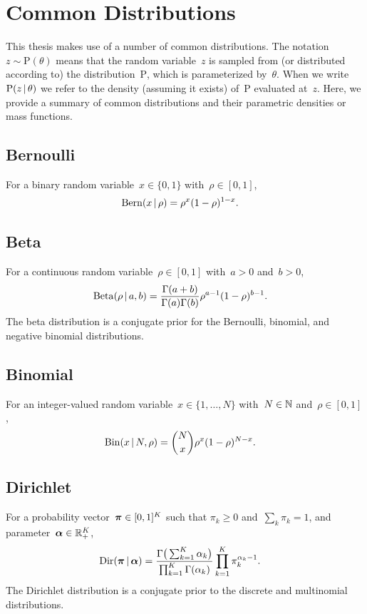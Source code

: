 \chapter{Common Distributions}
\label{app:A}

This thesis makes use of a number of common distributions.  The
notation~${z \sim \mathrm{P}(\theta)}$ means that the random
variable~$z$ is sampled from (or distributed according to) the
distribution~$\mathrm{P}$, which is parameterized by~$\theta$. When we
write~${\mathrm{P}(z \,|\, \theta)}$ we refer to the density
(assuming it exists) of~$\mathrm{P}$ evaluated at~$z$.  Here, we
provide a summary of common distributions and their parametric
densities or mass functions.

\section*{Bernoulli}
For a binary random variable~$x \in \{0,1\}$ with~$\rho \in [0,1]$,
\begin{align*}
  \mathrm{Bern}(x \,|\, \rho) &= \rho^x (1-\rho)^{1-x}.
\end{align*}

\section*{Beta}
For a continuous random variable~$\rho \in [0,1]$ with~$a>0$ and~$b>0$,
\begin{align*}
  \mathrm{Beta}(\rho \,|\, a, b)
  &= \frac{ \Gamma(a+b)}{\Gamma(a) \Gamma(b)} \rho^{a-1} (1-\rho)^{b-1}.
\end{align*}
The beta distribution is a conjugate prior for the Bernoulli,
binomial, and negative binomial distributions.

\section*{Binomial}
For an integer-valued random variable~$x \in \{1, \ldots, N \}$
with~$N \in \mathbb{N}$ and~$\rho \in [0,1]$,
\begin{align*}
  \mathrm{Bin}(x \,|\, N, \rho)
  &= {N \choose x} \rho^x (1-\rho)^{N-x}.
\end{align*}


\section*{Dirichlet}
For a probability vector~${\boldsymbol{\pi} \in [0,1]^K}$ such that
${\pi_k \geq 0}$ and~${\sum_k \pi_k = 1}$, and
parameter~${\boldsymbol{\alpha} \in \mathbb{R}_+^K}$,
\begin{align*}
  \mathrm{Dir}(\boldsymbol{\pi} \,|\, \boldsymbol{\alpha})
  &= \frac{\Gamma \big(\sum_{k=1}^K \alpha_k \big)}{\prod_{k=1}^K \Gamma(\alpha_k)}
  \prod_{k=1}^K \pi_k^{\alpha_k-1}.
\end{align*}
The Dirichlet distribution is a conjugate prior to the discrete and
multinomial distributions.

